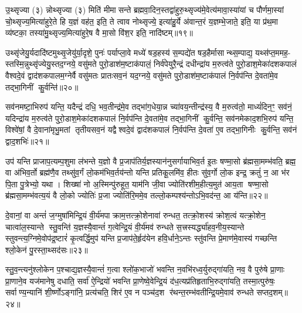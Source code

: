 {\anuvakamend[{उ॒दच॒त्युद्येऽह॑रा॒प्त्वा पञ्च॑दश च॥६॥}]}

उ॒थ्सृज्या (३) न्नोथ्सृज्या (३) मिति॑ मीमासन्ते ब्रह्मवा॒दिन॒स्तद्वा॑हुरु॒थ्सृज्य॑मे॒वेत्य॑मावा॒स्या॑यां च पौर्णमा॒स्यां चो॒थ्सृज्य॒मित्या॑हुरे॒ते हि य॒ज्ञं वह॑त॒ इति॒ ते त्वाव नोथ्सृज्ये॒ इत्या॑हु॒र्ये अ॑वान्त॒रं य॒ज्ञम्भे॒जाते॒ इति॒ या प्र॑थ॒मा व्य॑ष्टका॒ तस्या॑मु॒थ्सृज्य॒मित्या॑हुरे॒ष वै मा॒सो वि॑श॒र इति॒ नादि॑ष्टम्॥१९॥

उथ्सृ॑जेयु॒र्यदादि॑ष्टमुथ्सृ॒जेयु॑र्या॒दृशे॒ पुनः॑ पर्याप्ला॒वे मध्ये॑ षड॒हस्य॑ स॒म्पद्ये॑त षड॒हैर्मासान्थ्स॒म्पाद्य॒ यथ्स॑प्त॒ममह॒- स्तस्मि॒न्नुथ्सृ॑ज्येयु॒स्तद॒ग्नये॒ वसु॑मते पुरो॒डाश॑म॒ष्टाक॑पालं॒ निर्व॑पेयुरै॒न्द्रं दधीन्द्रा॑य म॒रुत्व॑ते पुरो॒डाश॒मेका॑दशकपालं वैश्वदे॒वं द्वाद॑शकपालम॒ग्नेर्वै वसु॑मतः प्रातःसव॒नं यद॒ग्नये॒ वसु॑मते पुरो॒डाश॑म॒ष्टाक॑पालं नि॒र्वप॑न्ति दे॒वता॑मे॒व तद्भा॒गिनीं कु॒र्वन्ति॑॥२०॥

सव॑नमष्टा॒भिरुप॑ यन्ति॒ यदैन्द्रं दधि॒ भव॒तीन्द्र॑मे॒व तद्भा॑ग॒धेया॒न्न च्या॑वय॒न्तीन्द्र॑स्य॒ वै म॒रुत्व॑तो॒ माध्यं॑दिन॒ꣳ॒ सव॑नं॒ यदिन्द्रा॑य म॒रुत्व॑ते पुरो॒डाश॒मेका॑दशकपालं नि॒र्वप॑न्ति दे॒वता॑मे॒व तद्भा॒गिनीं कु॒र्वन्ति॒ सव॑नमेकाद॒शभि॒रुप॑ यन्ति॒ विश्वे॑षां॒ वै दे॒वाना॑मृभु॒मतां तृतीयसव॒नं यद्वैश्वदे॒वं द्वाद॑शकपालं नि॒र्वप॑न्ति दे॒वता॑ ए॒व तद्भा॒गिनीः कु॒र्वन्ति॒ सव॑नं द्वाद॒शभिः॑॥२१॥

उप॑ यन्ति प्राजाप॒त्यम्प॒शुमा ल॑भन्ते य॒ज्ञो वै प्र॒जाप॑तिर्य॒ज्ञस्यान॑नुसर्गायाभिव॒र्त इ॒तः षण्मा॒सो ब्र॑ह्मसा॒मम्भ॑वति॒ ब्रह्म॒ वा अ॑भिव॒र्तो ब्रह्म॑णै॒व तथ्सु॑व॒र्गं लो॒कम॑भिव॒र्तय॑न्तो यन्ति प्रतिकू॒लमि॑व॒ हीतः सु॑व॒र्गो लो॒क इन्द्र॒ क्रतुं॑ न॒ आ भ॑र पि॒ता पु॒त्रेभ्यो॒ यथा। शिख्षा॑ नो अ॒स्मिन्पु॑रुहूत॒ याम॑नि जी॒वा ज्योति॑रशीम॒हीत्य॒मुत॑ आय॒ता षण्मा॒सो ब्र॑ह्मसा॒मम्भ॑वत्य॒यं वै लो॒को ज्योतिः॑ प्र॒जा ज्योति॑रि॒ममे॒व तल्लो॒कम्पश्य॑न्तोऽभि॒वद॑न्त॒ आ य॑न्ति॥२२॥

{\anuvakamend[{नादि॑ष्टङ्कु॒र्वन्ति॑ द्वाद॒शभि॒रिति॑ विश॒तिश्च॑॥७॥}]}

दे॒वानां॒ वा अन्तं॑ ज॒ग्मुषा॑मिन्द्रि॒यं वी॒र्य॑मपाक्राम॒त्तत्क्रो॒शेनावा॑ रुन्धत॒ तत्क्रो॒शस्य॑ क्रोश॒त्वं यत्क्रो॒शेन॒ चात्वा॑ल॒स्यान्ते स्तु॒वन्ति॑ य॒ज्ञस्यै॒वान्तं॑ ग॒त्वेन्द्रि॒यं वी॒र्य॑मव॑ रुन्धते स॒त्त्रस्यर्द्ध्या॑हव॒नीय॒स्यान्ते स्तुवन्त्य॒ग्निमे॒वोप॑द्र॒ष्टारं॑ कृ॒त्वर्द्धि॒मुप॑ यन्ति प्र॒जाप॑ते॒र्\mbox{}हृद॑येन हवि॒र्धाने॒ऽन्तः स्तु॑वन्ति प्रे॒माण॑मे॒वास्य॑ गच्छन्ति श्लो॒केन॑ पु॒रस्ता॒थ्सद॑सः॥२३॥

स्तु॒व॒न्त्यनु॑श्लोकेन प॒श्चाद्य॒ज्ञस्यै॒वान्तं॑ ग॒त्वा श्लो॑क॒भाजो॑ भवन्ति न॒वभि॑रध्व॒र्युरुद्गा॑यति॒ नव॒ वै पुरु॑षे प्रा॒णाः प्रा॒णाने॒व यज॑मानेषु दधाति॒ सर्वा॑ ऐ॒न्द्रियो॑ भवन्ति प्रा॒णेष्वे॒वेन्द्रि॒यं द॑ध॒त्यप्र॑तिहृताभि॒रुद्गा॑यति॒ तस्मा॒त्पुरु॑षः॒ सर्वाण्य॒न्यानि॑ शी॒र्ष्णोऽङ्गा॑नि॒ प्रत्य॑चति॒ शिर॑ ए॒व न पञ्च॑द॒श र॑थन्त॒रम्भ॑वतीन्द्रि॒यमे॒वाव॑ रुन्धते सप्तद॒शम्॥२४॥

